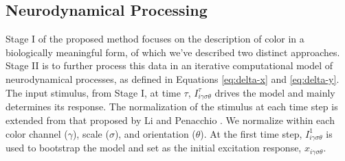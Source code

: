 \documentclass[journal,onecolumn]{IEEEtran}
\begin{document}
\subsection*{Neurodynamical Processing}

Stage I of the proposed method focuses on the description of color in a biologically meaningful form, of which we've described two distinct approaches. Stage II is to further process this data in an iterative computational model of neurodynamical processes, as defined in Equations \ref{eq:delta-x} and \ref{eq:delta-y}. The input stimulus, from Stage I, at time $\tau$, $I^\tau_{i\gamma\sigma\theta}$ drives the model and mainly determines its response. The normalization of the stimulus at each time step is extended from that proposed by Li \cite{li:1999} and Penacchio \cite{penacchio:2013}. We normalize within each color channel ($\gamma$), scale ($\sigma$), and orientation ($\theta$). At the first time step, $I^1_{i\gamma\sigma\theta}$ is used to bootstrap the model and set as the initial excitation response, $x_{i\gamma\sigma\theta}$.
\end{document}
